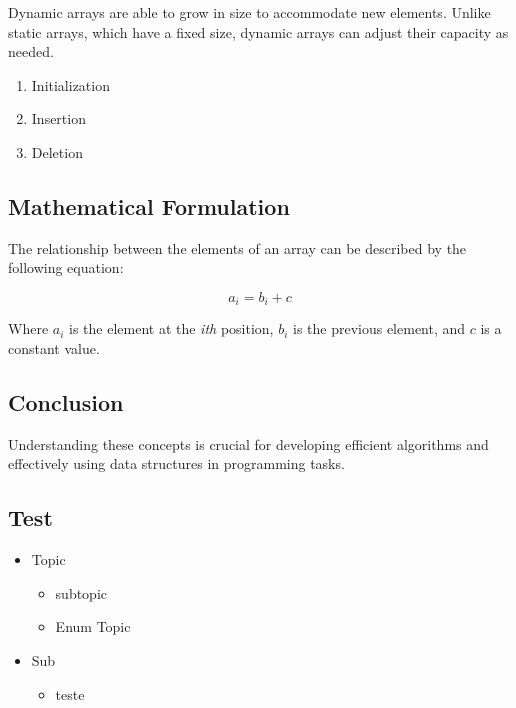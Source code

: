 Dynamic arrays are able to grow in size to accommodate new elements. Unlike static arrays, which have a fixed size, dynamic arrays can adjust their capacity as needed.

\begin{enumerate}
	\item Initialization
	\item Insertion
	\item Deletion
\end{enumerate}

\subsection*{Mathematical Formulation}

The relationship between the elements of an array can be described by the following equation:

\[
a_i = b_i + c
\]

Where $a_i$ is the element at the \textit{ith} position, $b_i$ is the previous element, and $c$ is a constant value.

\subsection*{Conclusion}

Understanding these concepts is crucial for developing efficient algorithms and effectively using data structures in programming tasks.

\hrulefill

\subsection*{Test}

\begin{itemize}
	\item Topic
	\begin{itemize}
		\item subtopic
		\item Enum Topic
	\end{itemize}
	\item Sub
	\begin{itemize}
		\item teste
	\end{itemize}

\end{itemize}

